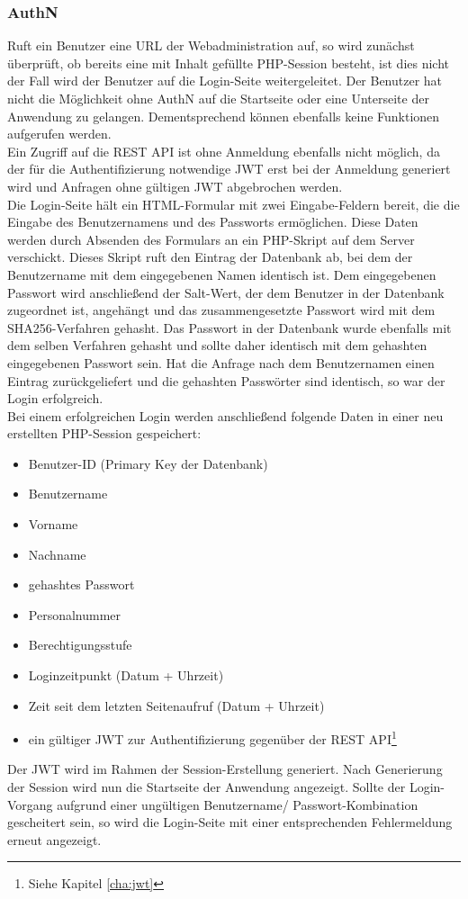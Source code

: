 \subsubsection{\acf{AuthN}}
Ruft ein Benutzer eine URL der Webadministration auf, so wird zunächst überprüft, ob bereits eine mit Inhalt gefüllte \ac{PHP}-Session besteht, ist dies nicht der Fall wird der Benutzer auf die Login-Seite weitergeleitet. Der Benutzer hat nicht die Möglichkeit ohne \acl{AuthN} auf die Startseite oder eine Unterseite der Anwendung zu gelangen. Dementsprechend können ebenfalls keine Funktionen aufgerufen werden.\\
Ein Zugriff auf die \acs{REST} \acs{API} ist ohne Anmeldung ebenfalls nicht möglich, da der für die Authentifizierung notwendige \acf{JWT} erst bei der Anmeldung generiert wird und Anfragen ohne gültigen \acs{JWT} abgebrochen werden.\\

Die Login-Seite hält ein \acs{HTML}-Formular mit zwei Eingabe-Feldern bereit, die die Eingabe des Benutzernamens und des Passworts ermöglichen. Diese Daten werden durch Absenden des Formulars an ein \acs{PHP}-Skript auf dem Server verschickt. Dieses Skript ruft den Eintrag der Datenbank ab, bei dem der Benutzername mit dem eingegebenen Namen identisch ist. Dem eingegebenen Passwort wird anschließend der Salt-Wert, der dem Benutzer in der Datenbank zugeordnet ist, angehängt und das zusammengesetzte Passwort wird mit dem SHA256-Verfahren gehasht. Das Passwort in der Datenbank wurde ebenfalls mit dem selben Verfahren gehasht und sollte daher identisch mit dem gehashten eingegebenen Passwort sein. Hat die Anfrage nach dem Benutzernamen einen Eintrag zurückgeliefert und die gehashten Passwörter sind identisch, so war der Login erfolgreich.\\
Bei einem erfolgreichen Login werden anschließend folgende Daten in einer neu erstellten \ac{PHP}-Session gespeichert:
\begin{itemize}
	\item Benutzer-ID (Primary Key der Datenbank)
	\item Benutzername
	\item Vorname
	\item Nachname
	\item gehashtes Passwort
	\item Personalnummer
	\item Berechtigungsstufe
	\item Loginzeitpunkt (Datum + Uhrzeit)
	\item Zeit seit dem letzten Seitenaufruf (Datum + Uhrzeit)
	\item ein gültiger \acs{JWT} zur Authentifizierung gegenüber der \acs{REST} \acs{API}\footnote{Siehe Kapitel \ref{cha:jwt} }
\end{itemize}
Der \acl{JWT} wird im Rahmen der Session-Erstellung generiert. Nach Generierung der Session wird nun die Startseite der Anwendung angezeigt. Sollte der Login-Vorgang aufgrund einer ungültigen Benutzername/ Passwort-Kom\-bination gescheitert sein, so wird die Login-Seite mit einer entsprechenden Fehlermeldung erneut angezeigt.\\

